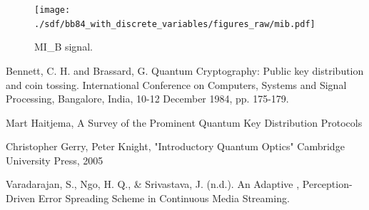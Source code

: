 \begin{figure}[h]
    \centering
        \texttt{[image: ./sdf/bb84\_with\_discrete\_variables/figures\_raw/mib.pdf]}
    \caption{MI\_B signal. }\label{mib}
\end{figure}


\begin{thebibliography}{2}
	Bennett, C. H. and Brassard,
	G. Quantum Cryptography: Public key distribution and coin tossing.
	International Conference on Computers, Systems and Signal Processing, Bangalore, India, 10-12 December 1984, pp. 175-179.
	
	Mart Haitjema, A Survey of the Prominent Quantum Key Distribution Protocols
	
	Christopher Gerry, Peter Knight, "Introductory Quantum Optics" Cambridge University Press, 2005
	
	Varadarajan, S., Ngo, H. Q., \& Srivastava, J. (n.d.). An Adaptive , Perception-Driven Error Spreading Scheme in Continuous Media Streaming.
	
\end{thebibliography}
\cleardoublepage
